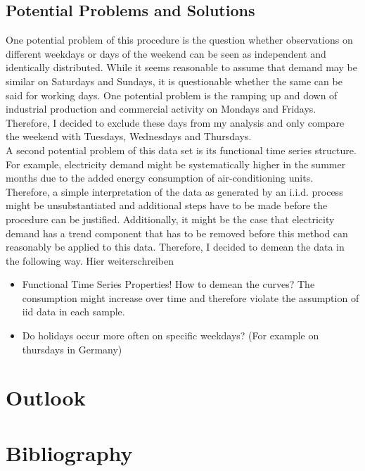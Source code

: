 \documentclass[12pt, a4paper]{article}
\theoremstyle{MAstyle} \newtheorem{assumption}{Assumption}[section]
\theoremstyle{MAstyle} \newtheorem{definition}{Definition}[section]
\begin{document}
		\subsection{Potential Problems and Solutions}
			One potential problem of this procedure is the question whether observations on different weekdays or days of the weekend can be seen as independent and identically distributed. While it seems reasonable to assume that demand may be similar on Saturdays and Sundays, it is questionable whether the same can be said for working days. 
			One potential problem is the ramping up and down of industrial production and commercial activity on Mondays and Fridays. Therefore, I decided to exclude these days from my analysis and only compare the weekend with Tuesdays, Wednesdays and Thursdays.\\
			
			A second potential problem of this data set is its functional time series structure. For example, electricity demand might be systematically higher in the summer months due to the added energy consumption of air-conditioning units. Therefore, a simple interpretation of the data as generated by an i.i.d. process might be unsubstantiated and additional steps have to be made before the procedure can be justified. 
			Additionally, it might be the case that electricity demand has a trend component that has to be removed before this method can reasonably be applied to this data. Therefore, I decided to demean the data in the following way. {\color{red}Hier weiterschreiben}
			
			\begin{itemize}
				\item Functional Time Series Properties! How to demean the curves? The consumption might increase over time and therefore violate the assumption of iid data in each sample.
				\item Do holidays occur more often on specific weekdays? (For example on thursdays in Germany)
			\end{itemize}
	
	\section{Outlook}\label{Outlook}
	
	\newpage
	\section{Bibliography}
	\printbibliography[heading=none]
	
\end{document}
